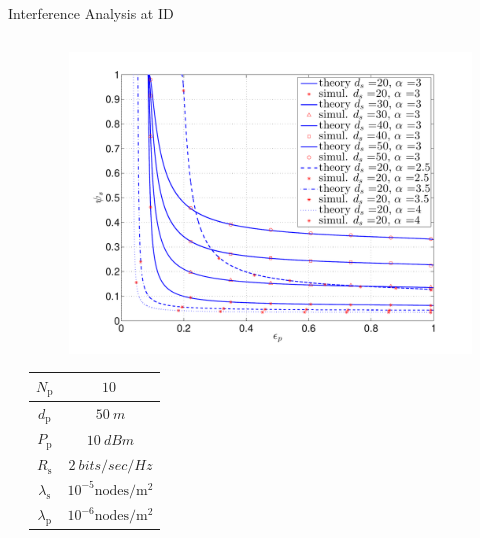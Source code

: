 \documentclass[12pt]{beamer}
\newcommand{\fs}[1]{\fontsize{ #1 pt}{8.2}\selectfont}
\newcommand{\sub}[1]{_{\text{#1}}}
\begin{document}
\begin{frame}[t]{Interference Analysis at ID}
\begin{columns}
\begin{column}{0.55\paperwidth}
\begin{overlayarea}{\textwidth}{7.4cm}
\begin{itemize}
	\end{itemize}
	\end{overlayarea}
	\end{column}
        
	\begin{column}{0.45\paperwidth}
	\only<4->
	{
	\begin{overlayarea}{\textwidth}{5.1cm}

	\begin{figure}
		\centering
		\includegraphics[trim=1.2cm 0.4cm 1.6cm 1.2cm,clip=true,width=0.42 \paperwidth]{../figures/fig_ID_Cap_Out_vs_epsilon_wkr_1e5.pdf}        
	\end{figure}
	\end{overlayarea}
	\begin{overlayarea}{\textwidth}{2.2cm}
	\vspace{-0.9cm}
	\fs{8}
	\begin{table}[t]
        	\renewcommand{\arraystretch}{1.3}
        \centering
        \begin{tabular}{c|c}
        \hline
		$N\sub{p}$ & $\SI{10}{}$ \\ \hline
        	$d\sub{p}$ & $\SI{50}{m}$ \\ \hline
		$P\sub{p}$ & $\SI{10}{dBm}$ \\ \hline
		$R\sub{s}$ & $\SI{2}{bits/sec/Hz}$  \\ \hline 	
		$\lambda\sub{s}$ & $10^{-5}\text{nodes}/{\text{m}^2}$  \\ \hline	
		$\lambda\sub{p}$ & $10^{-6}\text{nodes}/{\text{m}^2}$  \\ 	
\hline
        \end{tabular}
    \end{table}
    \end{overlayarea}

}
	\end{column}
\end{columns}
\end{frame}
\end{document}
